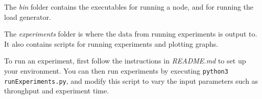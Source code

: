 The \textit{bin} folder contains the executables for running a node, and for running the load generator.

The \textit{experiments} folder is where the data from running experiments is output to. It also contains scripts for running experiments and plotting graphs.

To run an experiment, first follow the instructions in \textit{README.md} to set up your environment. You can then run experiments by executing \texttt{python3 runExperiments.py}, and modify this script to vary the input parameters such as throughput and experiment time.